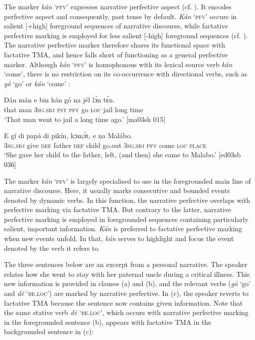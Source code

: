The marker \textit{kán} ‘\textsc{pfv}’ expresses narrative perfective aspect (cf. \citealt{Jaggar2006}). It encodes perfective aspect and consequently, past tense by default. \textit{Kán} ‘\textsc{pfv}’ occurs in salient [+high] foreground sequences of narrative discourse, while factative perfective marking is employed for less salient [-high] foreground sequences (cf. ). The narrative perfective marker therefore shares its functional space with factative TMA, and hence falls short of functioning as a general perfective marker. Although \textit{kán} ‘\textsc{pfv}’ is homophonous with its lexical source verb \textit{kán} ‘come’, there is no restriction on its co-occurrence with directional verbs, such as \textit{gó} ‘go’  or \textit{kán} ‘come’ :


\ea%
    \label{ex:key:323}
    \gll Dán    mán    e    bin  kán  gó  na  jél  lɔ́n    tɛ́n.\\
that    man    \textsc{3sg.sbj}  \textsc{pst}  \textsc{pfv}  go  \textsc{loc}  jail  long    time\\

\glt ‘That man went to jail a long time ago.’ [ma03sh 015]
\z


\ea%
    \label{ex:key:324}
    \gll E    gí  di  papá  di  pikín,  kɔmɔ́t,  e    
   na  Malábo.\\
\textsc{3sg.sbj}  give  \textsc{def}  father  \textsc{def}  child  go.out  \textsc{3sg.sbj}  \textsc{pfv}
come  \textsc{loc}  \textsc{place}\\

\glt ‘She gave her child to the father, left, (and then) she came to Malabo.’ [ed03sb 036]
\z


The marker \textit{kán} ‘\textsc{pfv}’ is largely specialised to use in the foregrounded main line of narrative discourse. Here, it usually marks consecutive and bounded events denoted by dynamic verbs. In this function, the narrative perfective overlaps with perfective marking via factative TMA. But contrary to the latter, narrative perfective marking is employed in foregrounded sequences containing particularly salient, important information. \textit{Kán} is preferred to factative perfective marking when new events unfold. In that, \textit{kán} serves to highlight and focus the event denoted by the verb it refers to. 


The three sentences below are an excerpt from a personal narrative. The speaker relates how she went to stay with her paternal uncle during a critical illness. This new information is provided in clauses (a) and (b), and the relevant verbs (\textit{gó} ‘go’ and \textit{dé} \textsc{‘be.loc’)} are marked by narrative perfective. In (c), the speaker reverts to factative TMA because the sentence now contains given information. Note that the same stative verb \textit{dé} \textsc{‘be.loc’,} which occurs with narrative perfective marking in the foregrounded sentence (b), appears with factative TMA in the backgrounded sentence in (c): 



